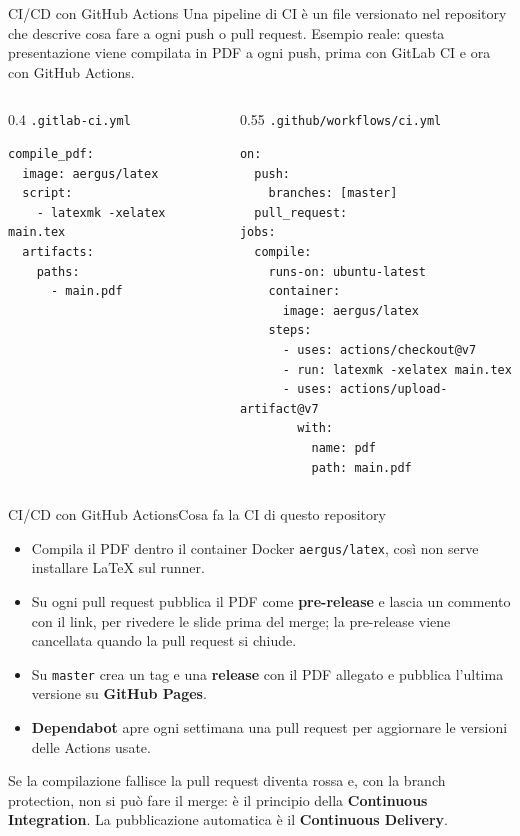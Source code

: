 \documentclass[aspectratio=169,handout,10pt]{beamer}
\begin{document}
\begin{frame}[fragile]{CI/CD con GitHub Actions}
    Una pipeline di CI è un file versionato nel repository che descrive cosa fare a ogni push o pull request. Esempio reale: questa presentazione viene compilata in PDF a ogni push, prima con GitLab CI e ora con GitHub Actions.
    \begin{columns}[T]
        \begin{column}{0.4\textwidth}
            \texttt{.gitlab-ci.yml}
            \begin{lstlisting}[basicstyle=\ttfamily\scriptsize]
compile_pdf:
  image: aergus/latex
  script:
    - latexmk -xelatex main.tex
  artifacts:
    paths:
      - main.pdf\end{lstlisting}
        \end{column}
        \begin{column}{0.55\textwidth}
            \texttt{.github/workflows/ci.yml}
            \begin{lstlisting}[basicstyle=\ttfamily\scriptsize]
on:
  push:
    branches: [master]
  pull_request:
jobs:
  compile:
    runs-on: ubuntu-latest
    container:
      image: aergus/latex
    steps:
      - uses: actions/checkout@v7
      - run: latexmk -xelatex main.tex
      - uses: actions/upload-artifact@v7
        with:
          name: pdf
          path: main.pdf\end{lstlisting}
        \end{column}
    \end{columns}
\end{frame}
\begin{frame}{CI/CD con GitHub Actions}{Cosa fa la CI di questo repository}
    \begin{itemize}
        \item Compila il PDF dentro il container Docker \texttt{aergus/latex}, così non serve installare LaTeX sul runner.
        \item Su ogni pull request pubblica il PDF come \textbf{pre-release} e lascia un commento con il link, per rivedere le slide prima del merge; la pre-release viene cancellata quando la pull request si chiude.
        \item Su \texttt{master} crea un tag e una \textbf{release} con il PDF allegato e pubblica l'ultima versione su \textbf{GitHub Pages}.
        \item \textbf{Dependabot} apre ogni settimana una pull request per aggiornare le versioni delle Actions usate.
    \end{itemize}
    Se la compilazione fallisce la pull request diventa rossa e, con la branch protection, non si può fare il merge: è il principio della \textbf{Continuous Integration}. La pubblicazione automatica è il \textbf{Continuous Delivery}.
\end{frame}
\end{document}
